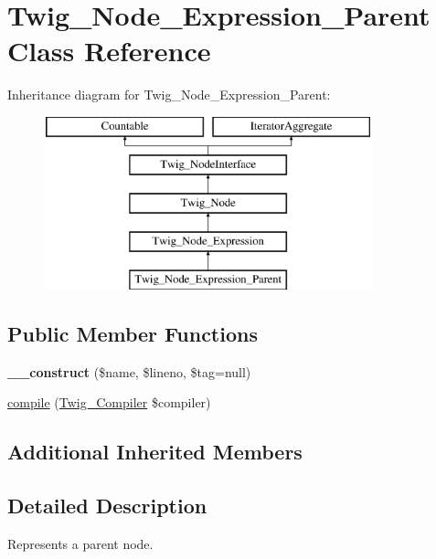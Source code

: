 \hypertarget{classTwig__Node__Expression__Parent}{}\section{Twig\+\_\+\+Node\+\_\+\+Expression\+\_\+\+Parent Class Reference}
\label{classTwig__Node__Expression__Parent}
Inheritance diagram for Twig\+\_\+\+Node\+\_\+\+Expression\+\_\+\+Parent\+:\begin{figure}[H]
\begin{center}
\leavevmode
\includegraphics[height=5.000000cm]{classTwig__Node__Expression__Parent}
\end{center}
\end{figure}
\subsection*{Public Member Functions}
\begin{DoxyCompactItemize}
\item 
{\bfseries \+\_\+\+\_\+construct} (\$name, \$lineno, \$tag=null)\hypertarget{classTwig__Node__Expression__Parent_a79e4a482b0f681e4292cac2360c8ab00}{}\label{classTwig__Node__Expression__Parent_a79e4a482b0f681e4292cac2360c8ab00}

\item 
\hyperlink{classTwig__Node__Expression__Parent_af80ce506c5ba596a30b6a0d12e47355e}{compile} (\hyperlink{classTwig__Compiler}{Twig\+\_\+\+Compiler} \$compiler)
\end{DoxyCompactItemize}
\subsection*{Additional Inherited Members}


\subsection{Detailed Description}
Represents a parent node.

